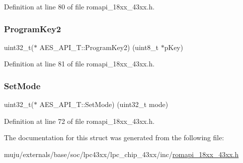 Definition at line 80 of file romapi\+\_\+18xx\+\_\+43xx.\+h.

\mbox{\label{struct_a_e_s___a_p_i___t_a81c3920e3c035eeb6a76bce343a68ec9}} 
\subsubsection{\texorpdfstring{Program\+Key2}{ProgramKey2}}
{\footnotesize\ttfamily uint32\+\_\+t($\ast$ A\+E\+S\+\_\+\+A\+P\+I\+\_\+\+T\+::\+Program\+Key2) (uint8\+\_\+t $\ast$p\+Key)}



Definition at line 81 of file romapi\+\_\+18xx\+\_\+43xx.\+h.

\mbox{\label{struct_a_e_s___a_p_i___t_a58fcd7ce78a91efd50bb391003b7393d}} 
\subsubsection{\texorpdfstring{Set\+Mode}{SetMode}}
{\footnotesize\ttfamily uint32\+\_\+t($\ast$ A\+E\+S\+\_\+\+A\+P\+I\+\_\+\+T\+::\+Set\+Mode) (uint32\+\_\+t mode)}



Definition at line 72 of file romapi\+\_\+18xx\+\_\+43xx.\+h.



The documentation for this struct was generated from the following file\+:\begin{DoxyCompactItemize}
\item 
muju/externals/base/soc/lpc43xx/lpc\+\_\+chip\+\_\+43xx/inc/\hyperlink{romapi__18xx__43xx_8h}{romapi\+\_\+18xx\+\_\+43xx.\+h}\end{DoxyCompactItemize}
